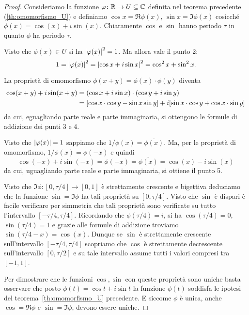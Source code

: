 \begin{proof}
Consideriamo la funzione $\varphi\colon {\mathbb R} \to U\subseteq {\mathbb C}$ 
definita nel teorema precedente (\ref{th:omomorfismo_U}) 
e definiamo $\cos x = \Re \phi(x)$, $\sin x = \Im \phi(x)$
cosicché $\phi(x) = \cos(x) + i \sin (x)$.
Chiaramente $\cos$ e $\sin$ hanno periodo $\tau$ in quanto 
$\phi$ ha periodo $\tau$.

Visto che $\phi(x)\in U$ si ha ${\left|\varphi(x)\right|}^2=1$.
Ma allora vale il punto 2:
\[
 1 = {\left|\varphi(x)\right|}^2 
 = {\left|\cos x + i\sin x\right|}^2 
 = \cos^2 x + \sin^2 x.
\]

La proprietà di omomorfismo 
$\phi(x+y)=\phi(x)\cdot \phi(y)$ diventa 
\begin{align*}
  \cos(x+y) + i \sin(x+y)
  &=(\cos x + i \sin x)\cdot(\cos y + i \sin y) \\
  &= 
  {\left[ \cos x\cdot \cos y - \sin x \sin y \right]}
  + i{\left[ \sin x\cdot \cos y + \cos x\cdot \sin y \right]}
\end{align*}
da cui, eguagliando parte reale e parte immaginaria, 
si ottengono le formule di addizione dei punti 3 e 4.

Visto che ${\left|\varphi(x)\right|}=1$ sappiamo che 
$1/\phi(x) = \overline{\phi(x)}$. 
Ma, per le proprietà di omomorfismo, $1/\phi(x)=\phi(-x)$ e quindi 
\[
\cos (-x) + i \sin(-x) 
= \phi(-x) 
= \overline{\phi(x)}
= \cos(x) - i \sin(x)
\]
da cui, uguagliando parte reale e parte immaginaria, 
si ottiene il punto 5.

Visto che $\Im \phi\colon[0,\tau/4]\to[0,1]$ 
è strettamente crescente e bigettiva
deduciamo che la funzione $\sin = \Im \phi$
ha tali proprietà su $[0,\tau/4]$. 
Visto che $\sin$ è dispari è facile verificare
per simmetria che tali proprietà sono verificate 
su tutto l'intervallo $[-\tau/4,\tau/4]$.
Ricordando che $\phi(\tau/4)=i$, 
si ha $\cos(\tau/4)=0$, $\sin(\tau/4)=1$ e grazie alle formule 
di addizione troviamo $\sin(\tau/4-x)=\cos(x)$.
Dunque se $\sin$ è strettamente crescente sull'intervallo 
$[-\tau/4,\tau/4]$ scopriamo che $\cos$ è strettamente 
decrescente sull'intervallo $[0,\tau/2]$
e su tale intervallo assume 
tutti i valori compresi tra $[-1,1]$.

Per dimostrare che le funzioni $\cos,\sin$ con queste proprietà sono uniche
basta osservare che posto $\phi(t) = \cos t + i\sin t$ la funzione 
$\phi(t)$ soddisfa le ipotesi del teorema~\ref{th:omomorfismo_U} precedente.
E siccome $\phi$ è unica, anche $\cos = \Re \phi$ e $\sin = \Im \phi$,
devono essere uniche.
\end{proof}

